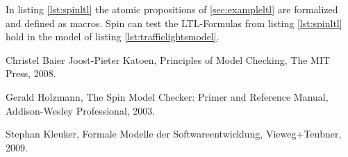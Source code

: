 \documentclass[12pt,a4paper,twoside]{article}
\begin{document}
In listing \ref{lst:spinltl} the atomic propositions of \ref{sec:exampleltl} are formalized and defined as macros. Spin can test the LTL-Formulas from listing \ref{lst:spinltl} hold in the model of listing \ref{lst:trafficlightsmodel}.

\begin{thebibliography}{9}
Christel Baier Joost-Pieter Katoen,
Principles of Model Checking,
The MIT Press,
2008.

Gerald Holzmann,
The Spin Model Checker: Primer and Reference Manual,
Addison-Wesley Professional,
2003.

Stephan Kleuker,
Formale Modelle der Softwareent\-wicklung,
View\-eg+\-Teub\-ner,
2009.

\end{thebibliography}
\end{document}
